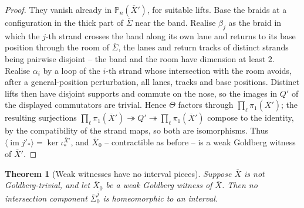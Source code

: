 \documentclass[reqno]{amsart}
\newtheorem{theorem}{Theorem}[section]
\theoremstyle{definition}
\newcommand{\PB}{\mathbb{P}}
\newcommand{\im}{\operatorname{im}}
\newcommand{\co}[1]{\mathopen{\langle}#1\mathclose{\rangle}} %
\renewcommand{\bar}{\overline}
\numberwithin{equation}{section}
\begin{document}
\begin{proof}
They vanish already in
\(\PB_n(\bar X')\), for suitable lifts. Base the braids at a
configuration in the thick part of \(\bar\Sigma\) near the
band. Realise \(\beta_j\) as the braid in which the \(j\)-th
strand crosses the band along its own lane and returns to its
base position through the room of \(\bar\Sigma\), the lanes
and return tracks of distinct strands being pairwise disjoint
-- the band and the room have dimension at least \(2\).
Realise \(\alpha_i\) by a loop of the \(i\)-th strand whose
intersection with the room avoids, after a general-position
perturbation, all lanes, tracks and base positions. Distinct
lifts then have disjoint supports and commute on the nose, so
the images in \(Q'\) of the displayed commutators are
trivial. Hence \(\bar\Theta\) factors through
\(\prod_\ell\pi_1(\bar X')\); the resulting surjections
\(\prod_\ell\pi_1(\bar X')\twoheadrightarrow Q'
\twoheadrightarrow\prod_\ell\pi_1(\bar X')\) compose to the
identity, by the compatibility of the strand maps, so both
are isomorphisms. Thus
\(\co{\im j'_\ast}=\ker\iota^{\bar X'}_\ast\), and
\(\bar X_0\) -- contractible as before -- is a weak Goldberg
witness of \(\bar X'\).
\end{proof}

\begin{theorem}[Weak witnesses have no interval pieces]
\label{thm:no-interval-pieces}
Suppose \(\bar X\) is not Goldberg-trivial, and let
\(\bar X_0\) be a weak Goldberg witness of \(\bar X\). Then no
intersection component \(\bar\Sigma_0^j\) is homeomorphic to an
interval.
\end{theorem}
\end{document}
